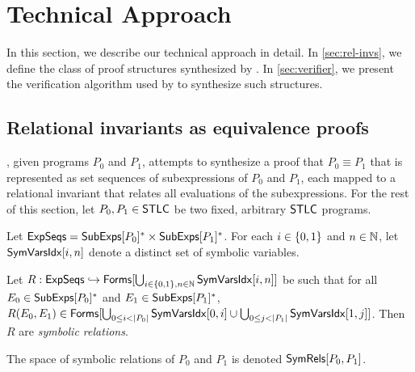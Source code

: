\section{Technical Approach}
%
In this section, we describe our technical approach in detail.
%
In \autoref{sec:rel-invs}, we define the class of proof
structures synthesized by \sys.
%
In \autoref{sec:verifier}, we present the verification algorithm used
by \sys to synthesize such structures.

\subsection{Relational invariants as equivalence proofs}
\label{sec:rel-invs}
%
\sys, given programs $P_0$ and $P_1$, attempts to synthesize a proof
that $P_0 \equiv P_1$ that is represented as set sequences of
subexpressions of $P_0$ and $P_1$, each mapped to a relational
invariant that relates all evaluations of the subexpressions.
%
For the rest of this section, let $P_0, P_1 \in \mathsf{STLC}$ be two fixed,
arbitrary $\mathsf{STLC}$ programs.

Let $\mathsf{ExpSeqs} = \mathsf{SubExps}[ P_0 ]^{*} \times \mathsf{SubExps}[ P_1 ]^{*}$.
For each $i \in \{ 0, 1 \}$ and $n \in \mathbb{N}$, let
$\mathsf{SymVarsIdx}[ i, n ]$ denote a distinct set of symbolic variables.
%
%
\begin{defn}
  \label{defn:sym-rels}
  Let $R: \mathsf{ExpSeqs} \hookrightarrow \mathsf{Forms}[  \bigcup_{i \in \{ 0 ,
        1 \}, n \in \mathbb{N} } \mathsf{SymVarsIdx}[ i, n ]  ]$ be such that %
  for all $E_0 \in \mathsf{SubExps}[ P_0 ]^{*}$ and $E_1 \in \mathsf{SubExps}[ P_1 ]^{*}$,
  $R(E_0, E_1) \in \formulas{ %
    \bigunion_{ 0 \leq i < |P_0|} \symvarsidx{0}{i} \union %
    \bigunion_{0 \leq j < |P_1|} \symvarsidx{1}{j} }$.
  Then $R$ are \emph{symbolic relations}.
\end{defn}
%
The space of symbolic relations of $P_0$ and $P_1$ is denoted
$\mathsf{SymRels}[ P_0, P_1 ]$.

